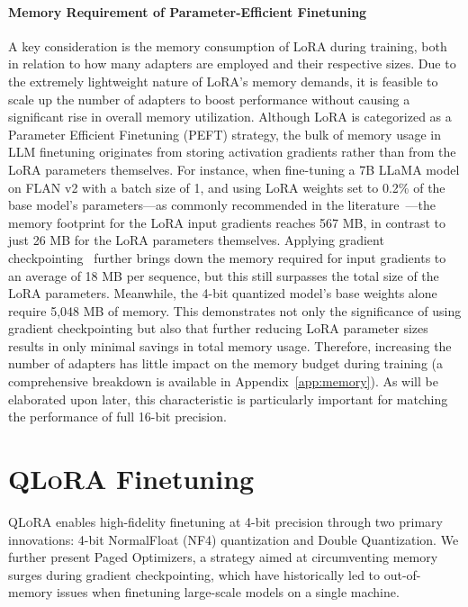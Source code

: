 \paragraph{Memory Requirement of Parameter-Efficient Finetuning} A key consideration is the memory consumption of LoRA during training, both in relation to how many adapters are employed and their respective sizes. Due to the extremely lightweight nature of LoRA's memory demands, it is feasible to scale up the number of adapters to boost performance without causing a significant rise in overall memory utilization. Although LoRA is categorized as a Parameter Efficient Finetuning (PEFT) strategy, the bulk of memory usage in LLM finetuning originates from storing activation gradients rather than from the LoRA parameters themselves. For instance, when fine-tuning a 7B LLaMA model on FLAN v2 with a batch size of 1, and using LoRA weights set to 0.2\% of the base model’s parameters—as commonly recommended in the literature~\citep{hu2021lora,liu2022few}—the memory footprint for the LoRA input gradients reaches 567 MB, in contrast to just 26 MB for the LoRA parameters themselves. Applying gradient checkpointing~\citep{chen2016training} further brings down the memory required for input gradients to an average of 18 MB per sequence, but this still surpasses the total size of the LoRA parameters. Meanwhile, the 4-bit quantized model’s base weights alone require 5,048 MB of memory. This demonstrates not only the significance of using gradient checkpointing but also that further reducing LoRA parameter sizes results in only minimal savings in total memory usage. Therefore, increasing the number of adapters has little impact on the memory budget during training (a comprehensive breakdown is available in Appendix~\ref{app:memory}). As will be elaborated upon later, this characteristic is particularly important for matching the performance of full 16-bit precision.

\section{\textsc{QLoRA} Finetuning}

\textsc{QLoRA} enables high-fidelity finetuning at 4-bit precision through two primary innovations: 4-bit NormalFloat (NF4) quantization and Double Quantization. We further present Paged Optimizers, a strategy aimed at circumventing memory surges during gradient checkpointing, which have historically led to out-of-memory issues when finetuning large-scale models on a single machine.

